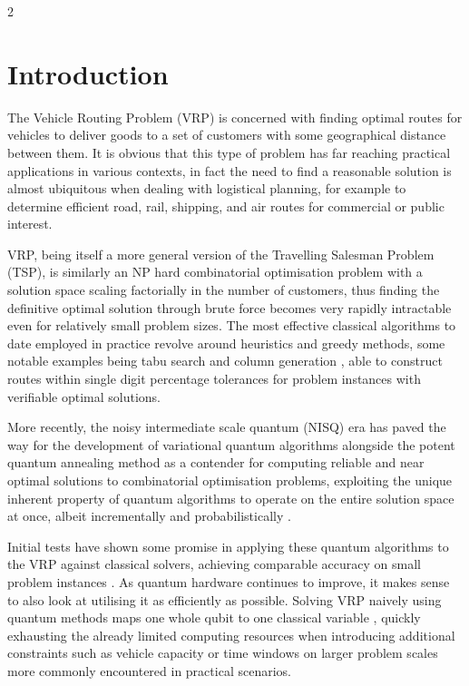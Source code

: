 \documentclass [10pt]{article}
\begin{document}
\begin {multicols}{2}

%

\section {Introduction}
The Vehicle Routing Problem (VRP) is concerned with finding optimal routes
for vehicles to deliver goods to a set of customers with some geographical
distance between them. It is obvious that this type of problem has far
reaching practical applications in various contexts, in fact the need to find
a reasonable solution is almost ubiquitous when dealing with logistical
planning, for example to determine efficient road, rail, shipping, and air
routes for commercial or public interest.

VRP, being itself a more general version of the Travelling Salesman Problem
(TSP), is similarly an NP hard \cite{vrp} combinatorial optimisation problem
with a solution space scaling factorially in the number of customers, thus
finding the definitive optimal solution through brute force becomes very
rapidly intractable even for relatively small problem sizes. The most
effective classical algorithms to date employed in practice revolve around
heuristics and greedy methods, some notable examples being tabu search
\cite{tabusearch} and column generation \cite{colgen}, able to construct
routes within single digit percentage tolerances \cite{metaheuristic} for
problem instances with verifiable optimal solutions.

More recently, the noisy intermediate scale quantum (NISQ) era \cite{nisq} has
paved the way for the development of variational quantum algorithms alongside
the potent quantum annealing \cite{annealintro} method as a contender for
computing reliable and near optimal solutions to combinatorial optimisation
problems, exploiting the unique inherent property of quantum algorithms to
operate on the entire solution space at once, albeit incrementally and
probabilistically \cite{qcintro}.

Initial tests have shown some promise in applying these quantum algorithms
to the VRP against classical solvers, achieving comparable accuracy on
small problem instances \cite{cvrpanneal} \cite{effvrp}.
As quantum hardware continues to improve, it makes
sense to also look at utilising it as efficiently as possible. Solving VRP
naively using quantum methods maps one whole qubit to one classical variable
\cite{effvrp},
quickly exhausting the already limited computing resources when introducing
additional constraints such as vehicle capacity or time windows on larger
problem scales more commonly encountered in practical scenarios.


\end{multicols}
\end{document}
